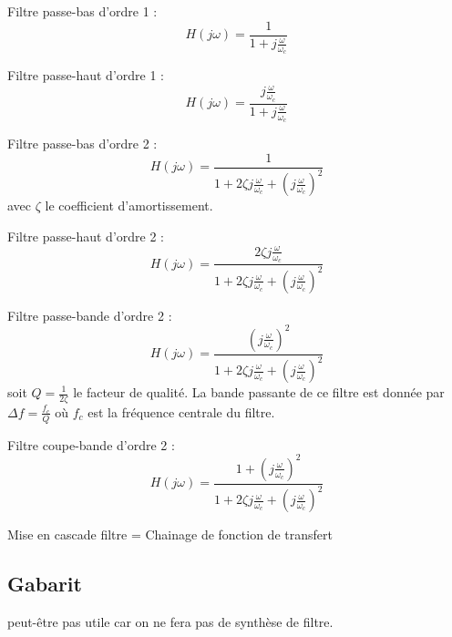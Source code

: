 \documentclass[]{report}
\begin{document}
	Filtre passe-bas d'ordre 1 :
	\begin{equation}\label{key}
	H(j\omega) = \frac{1}{1+j\frac{\omega}{\omega_{c}}}
	\end{equation}
	
	Filtre passe-haut d'ordre 1 :
	\begin{equation}\label{key}
	H(j\omega) = \frac{j\frac{\omega}{\omega_{c}}}{1+j\frac{\omega}{\omega_{c}}}
	\end{equation}
	
	Filtre passe-bas d'ordre 2 :
	\begin{equation}\label{key}
	H(j\omega) = \frac{1}{1+2\zeta j\frac{\omega}{\omega_{c}}+(j\frac{\omega}{\omega_{c}})^{2}}
	\end{equation}
	avec $\zeta$ le coefficient d'amortissement.
	\newline
	
	Filtre passe-haut d'ordre 2 :
	\begin{equation}\label{key}
	H(j\omega) = \frac{2\zeta j\frac{\omega}{\omega_{c}}}{1+2\zeta j\frac{\omega}{\omega_{c}}+(j\frac{\omega}{\omega_{c}})^{2}}
	\end{equation}
	
	Filtre passe-bande d'ordre 2 :
	\begin{equation}\label{key}
	H(j\omega) = \frac{(j\frac{\omega}{\omega_{c}})^{2}}{1+2\zeta j\frac{\omega}{\omega_{c}}+(j\frac{\omega}{\omega_{c}})^{2}}
	\end{equation}
	soit $Q = \frac{1}{2\zeta}$ le facteur de qualité. La bande passante de ce filtre est donnée par $\Delta f=\frac{f_{c}}{Q}$ où $f_{c}$ est la fréquence centrale du filtre.
	
	Filtre coupe-bande d'ordre 2 :
	\begin{equation}\label{key}
	H(j\omega) = \frac{1+(j\frac{\omega}{\omega_{c}})^{2}}{1+2\zeta j\frac{\omega}{\omega_{c}}+(j\frac{\omega}{\omega_{c}})^{2}}
	\end{equation}
	
	
	Mise en cascade filtre = Chainage de fonction de transfert
	
	\subsection{Gabarit}
	peut-être pas utile car on ne fera pas de synthèse de filtre.
	
\end{document}
